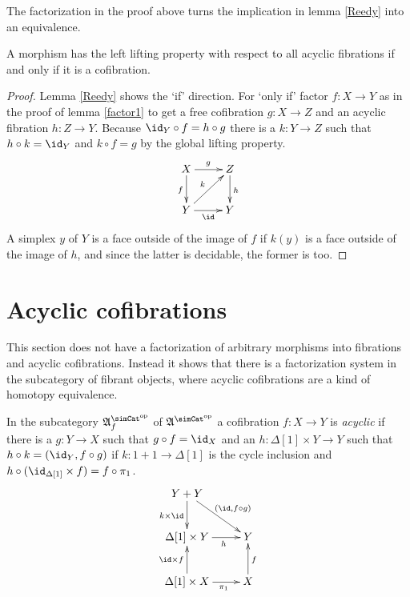 \documentclass{tac}
\newcommand\hide[1]{}
\newcommand\dual{^{\mathrm{op}}}
\newcommand\s{^{\simCat\dual}}
\newcommand\of{:}
\newcommand\simplex\Delta
\newcommand\f{_f}
\newcommand\ambient{\mathfrak A}
\begin{document}
\hide{ In acyclic cofibrations the codomain may have a distance function, that gives an upper bound to the number of compositions required to to reach it. I don't have time to work that out and check it right now.
}

The factorization in the proof above turns the implication in lemma \ref{Reedy} into an equivalence.

\begin{proposition} A morphism has the left lifting property with respect to all acyclic fibrations if and only if it is a cofibration. \label{cofibration characterization} \end{proposition}

\begin{proof} Lemma \ref{Reedy} shows the `if' direction. For `only if' factor $f\of X\to Y$ as in the proof of lemma \ref{factor1} to get a free cofibration $g\of X\to Z$ and an acyclic fibration $h\of Z\to Y$. Because $\id_Y\circ f = h\circ g$ there is a $k\of Y\to Z$ such that $h\circ k = \id_Y$ and $k\circ f = g$ by the global lifting property. 
\[
\xymatrix{
X\ar[d]_f \ar[r]^g & Z\ar[d]^h\\
Y\ar[r]_\id \ar[ur]^k & Y
}
\]
A simplex $y$ of $Y$ is a face outside of the image of $f$ if $k(y)$ is a face outside of the image of $h$, and since the latter is decidable, the former is too.\end{proof}

\section{Acyclic cofibrations}
This section does not have a factorization of arbitrary morphisms into fibrations and acyclic cofibrations. Instead it shows that there is a factorization system in the subcategory of fibrant objects, where acyclic cofibrations are a kind of homotopy equivalence.

\begin{definition} In the subcategory $\ambient\s\f$ of $\ambient\s$ a cofibration $f\of X\to Y$ is \emph{acyclic} if there is a $g\of Y\to X$ such that $g\circ f = \id_X$ and an $h\of \simplex[1]\times Y\to Y$ such that $h\circ k = (\id_Y,f\circ g)$ if $k\of 1+1\to\simplex[1]$ is the cycle inclusion and 
$h\circ (\id_{\simplex[1]}\times f) = f\circ\pi_1$.
\[\xymatrix{
Y+Y\ar[d]_{k\times \id} \ar[dr]^{(\id,f\circ g)}\\
\simplex[1]\times Y \ar[r]_(.6)h & Y\\
\simplex[1]\times X \ar[r]_(.6){\pi_1}\ar[u]^{\id\times f} & X\ar[u]_f\\
}\]\label{acyclic cofibration}
\end{definition}
\end{document}
